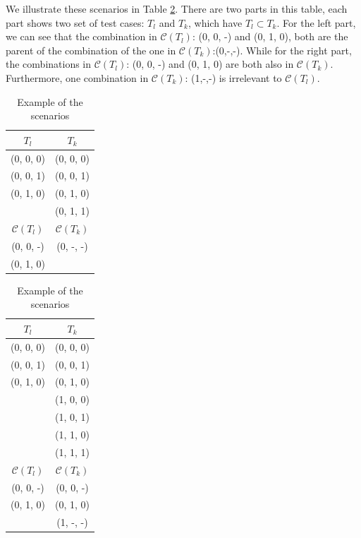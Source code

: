 \documentclass{sig-alternate}
\begin{document}
We illustrate these scenarios in Table \ref{example_three_condition}. There are two parts in this table, each part shows two set of test cases: $T_{l}$ and $T_{k}$, which have $T_{l} \subset T_{k}$. For the left part, we can see that the combination in $\mathcal{C}(T_{l})$: (0, 0, -) and (0, 1, 0), both are the parent of the combination of the one in $\mathcal{C}(T_{k})$:(0,-,-). While for the right part, the combinations in $\mathcal{C}(T_{l})$: (0, 0, -) and (0, 1, 0) are both also in $\mathcal{C}(T_{k})$. Furthermore, one combination in $\mathcal{C}(T_{k})$: (1,-,-) is irrelevant to $\mathcal{C}(T_{l})$.


%

\begin{table}
\centering
\caption{Example of the scenarios}
\label{example_three_condition}
  \begin{tabular}{cc}
$T_{l}$&$T_{k}$ \\ \hline
(0, 0, 0)&(0, 0, 0)\\
(0, 0, 1)&(0, 0, 1) \\
(0, 1, 0)&(0, 1, 0)\\
         &(0, 1, 1) \\ \hline
 $\mathcal{C}(T_{l})$& $\mathcal{C}(T_{k})$ \\ \hline
(0, 0, -)&(0, -, -)\\
(0, 1, 0)&		   \\ \hline
  \end{tabular}
  \hspace{1em}
  \begin{tabular}{cc}
$T_{l}$&$T_{k}$\\ \hline
(0, 0, 0) & (0, 0, 0)\\
(0, 0, 1) & (0, 0, 1)\\
(0, 1, 0) & (0, 1, 0)\\
		  & (1, 0, 0)\\
		  & (1, 0, 1)\\
		  & (1, 1, 0)\\
		  & (1, 1, 1)\\ \hline
$\mathcal{C}(T_{l})$& $\mathcal{C}(T_{k})$ \\ \hline
(0, 0, -)&  (0, 0, -)\\
(0, 1, 0)&  (0, 1, 0)\\
		 &  (1, -, -)\\  \hline
  \end{tabular}
  \end{table}
\end{document}
